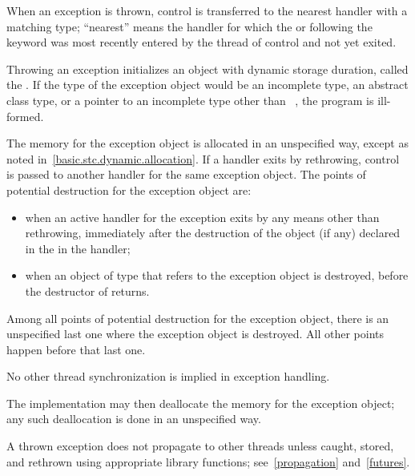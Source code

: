 \pnum
{}%
%
%
When an exception is thrown, control is transferred to the nearest handler with
a matching type; ``nearest'' means the handler
for which the
 or
following the
keyword was most recently entered by the thread of control and not yet exited.

\pnum
Throwing an exception
initializes an object with dynamic storage duration,
called the
.
If the type of the exception object would be
an incomplete type,
an abstract class type,
or a pointer to an incomplete type other than
\cv{}~,
the program is ill-formed.

\pnum
{}%
%
%
The memory for the exception object is
allocated in an unspecified way, except as noted in~\ref{basic.stc.dynamic.allocation}.
If a handler exits by rethrowing, control is passed to another handler for
the same exception object.
The points of potential destruction for the exception object are:
\begin{itemize}
\item
when an active handler for the exception exits by
any means other than
rethrowing,
immediately after the destruction of the object (if any)
declared in the  in the handler;

\item
when an object of type 
that refers to the exception object is destroyed,
before the destructor of  returns.
\end{itemize}

Among all points of potential destruction for the exception object,
there is an unspecified last one
where the exception object is destroyed.
All other points happen before that last one.
\begin{note}
No other thread synchronization is implied in exception handling.
\end{note}
The implementation may then
deallocate the memory for the exception object; any such deallocation
is done in an unspecified way.
\begin{note}
A thrown exception does not
propagate to other threads unless caught, stored, and rethrown using
appropriate library functions; see~\ref{propagation} and~\ref{futures}.
\end{note}

